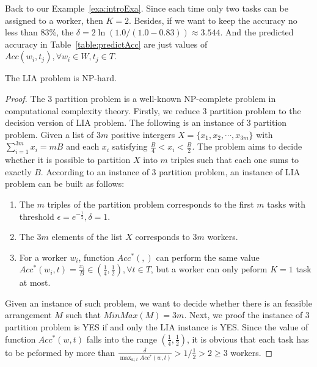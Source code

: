 \begin{example}
Back to our Example~\ref{exa:introExa}.
Since each time only two tasks can be assigned to a worker, then $K = 2$.
Besides, if we want to keep the accuracy no less than 83\%, the $\delta = 2\ln(1.0/(1.0-0.83)) \approx 3.544$.
And the predicted accuracy in Table~\ref{table:predictAcc} are just values of $Acc(w_i,t_j), \forall w_i \in W, t_j \in T $.
\end{example}

\begin{theorem}
The LIA problem is NP-hard.
\end{theorem}
\begin{proof}
The 3 partition problem\cite{ThreePar} is a well-known NP-complete problem in computational complexity theory.
Firstly, we reduce 3 partition problem to the decision version of LIA problem. 
The following is an instance of 3 partition problem.
Given a list of $3m$ positive intergers $X = \{x_1, x_2, \cdots, x_{3m}\}$ with $\sum_{i=1}^{3m} x_i = mB$ and
each $x_i$ satisfying $\frac{B}{4} < x_i < \frac{B}{2}$.
The problem aims to decide whether it is possible to partition $X$ into $m$ triples such that each one sums to exactly $B$.  
According to an instance of 3 partition problem, an instance of LIA problem can be built as follows:
\begin{enumerate}[(1)]
	\vspace{-1ex}
	\item The $m$ triples of the partition problem corresponds to the first $m$ tasks with threshold $\epsilon = e^{-\frac{1}{2}}, \delta = 1$. \\
	\vspace{-1ex}
	\item The $3m$ elements of the list $X$ corresponds to $3m$ workers. \\
	\vspace{-1ex}
	\item For a worker $w_i$, function $Acc^{*}(,)$ can perform the same value $Acc^{*}(w_i, t) = \frac{x_i}{B} \in (\frac{1}{4}, \frac{1}{2}), \forall t \in T$, but a worker can only peform $K = 1$ task at most.
\end{enumerate}
Given an instance of such problem, we want to decide whether there is an feasible arrangement $M$ such that $MinMax(M) = 3m$.
Next, we proof the instance of 3 partition problem is YES if and only the LIA instance is YES.
Since the value of function $Acc^{*}(w, t)$ falls into the range $(\frac{1}{4}, \frac{1}{2})$, 
it is obvious that each task has to be peformed by more than $\frac{\delta}{\max_{w,t} Acc^{*}(w, t)} > 1/{\frac{1}{2}} > 2 \ge 3$ workers.

\end{proof}
